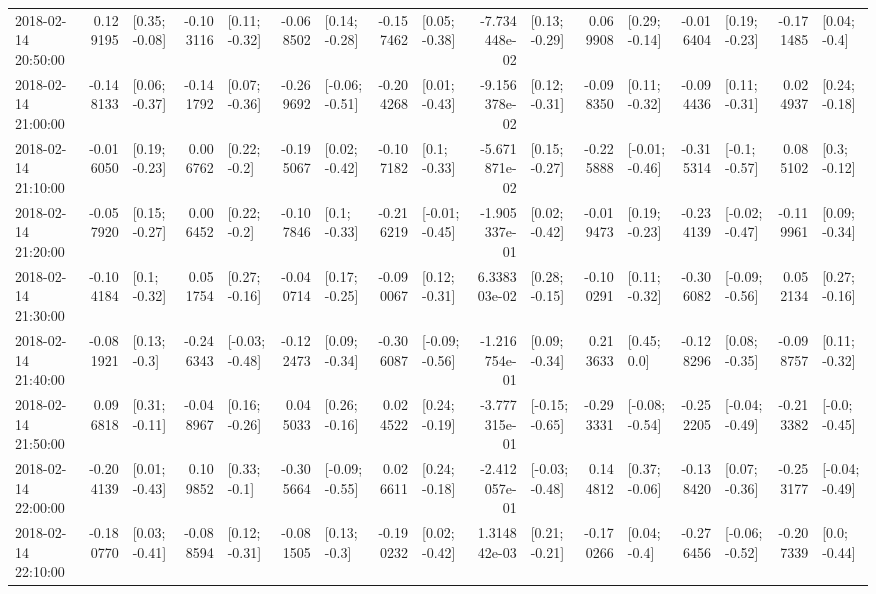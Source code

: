 \begin{tabular}{lrlrlrlrlrlrlrlrl}
2018-02-14 20:50:00 &  0.129195 &   [0.35; -0.08] & -0.103116 &   [0.11; -0.32] & -0.068502 &   [0.14; -0.28] & -0.157462 &   [0.05; -0.38] & -7.734448e-02 &   [0.13; -0.29] &  0.069908 &   [0.29; -0.14] & -0.016404 &   [0.19; -0.23] & -0.171485 &    [0.04; -0.4] \\
2018-02-14 21:00:00 & -0.148133 &   [0.06; -0.37] & -0.141792 &   [0.07; -0.36] & -0.269692 &  [-0.06; -0.51] & -0.204268 &   [0.01; -0.43] & -9.156378e-02 &   [0.12; -0.31] & -0.098350 &   [0.11; -0.32] & -0.094436 &   [0.11; -0.31] &  0.024937 &   [0.24; -0.18] \\
2018-02-14 21:10:00 & -0.016050 &   [0.19; -0.23] &  0.006762 &    [0.22; -0.2] & -0.195067 &   [0.02; -0.42] & -0.107182 &    [0.1; -0.33] & -5.671871e-02 &   [0.15; -0.27] & -0.225888 &  [-0.01; -0.46] & -0.315314 &   [-0.1; -0.57] &  0.085102 &    [0.3; -0.12] \\
2018-02-14 21:20:00 & -0.057920 &   [0.15; -0.27] &  0.006452 &    [0.22; -0.2] & -0.107846 &    [0.1; -0.33] & -0.216219 &  [-0.01; -0.45] & -1.905337e-01 &   [0.02; -0.42] & -0.019473 &   [0.19; -0.23] & -0.234139 &  [-0.02; -0.47] & -0.119961 &   [0.09; -0.34] \\
2018-02-14 21:30:00 & -0.104184 &    [0.1; -0.32] &  0.051754 &   [0.27; -0.16] & -0.040714 &   [0.17; -0.25] & -0.090067 &   [0.12; -0.31] &  6.338303e-02 &   [0.28; -0.15] & -0.100291 &   [0.11; -0.32] & -0.306082 &  [-0.09; -0.56] &  0.052134 &   [0.27; -0.16] \\
2018-02-14 21:40:00 & -0.081921 &    [0.13; -0.3] & -0.246343 &  [-0.03; -0.48] & -0.122473 &   [0.09; -0.34] & -0.306087 &  [-0.09; -0.56] & -1.216754e-01 &   [0.09; -0.34] &  0.213633 &     [0.45; 0.0] & -0.128296 &   [0.08; -0.35] & -0.098757 &   [0.11; -0.32] \\
2018-02-14 21:50:00 &  0.096818 &   [0.31; -0.11] & -0.048967 &   [0.16; -0.26] &  0.045033 &   [0.26; -0.16] &  0.024522 &   [0.24; -0.19] & -3.777315e-01 &  [-0.15; -0.65] & -0.293331 &  [-0.08; -0.54] & -0.252205 &  [-0.04; -0.49] & -0.213382 &   [-0.0; -0.45] \\
2018-02-14 22:00:00 & -0.204139 &   [0.01; -0.43] &  0.109852 &    [0.33; -0.1] & -0.305664 &  [-0.09; -0.55] &  0.026611 &   [0.24; -0.18] & -2.412057e-01 &  [-0.03; -0.48] &  0.144812 &   [0.37; -0.06] & -0.138420 &   [0.07; -0.36] & -0.253177 &  [-0.04; -0.49] \\
2018-02-14 22:10:00 & -0.180770 &   [0.03; -0.41] & -0.088594 &   [0.12; -0.31] & -0.081505 &    [0.13; -0.3] & -0.190232 &   [0.02; -0.42] &  1.314842e-03 &   [0.21; -0.21] & -0.170266 &    [0.04; -0.4] & -0.276456 &  [-0.06; -0.52] & -0.207339 &    [0.0; -0.44] \\

\end{tabular}

